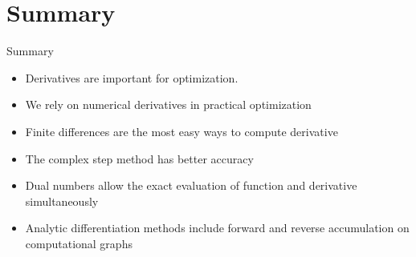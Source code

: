 \documentclass{beamer}
\begin{document}
\section{Summary}
\begin{frame}{Summary}
    \begin{itemize}
        \item Derivatives are important for optimization. 
        \item We rely on numerical derivatives in practical optimization
        \item Finite differences are the most easy ways to compute derivative
        \item The complex step method has better accuracy
        \item Dual numbers allow the exact evaluation of function and derivative simultaneously
        \item Analytic differentiation methods include forward and reverse accumulation on computational graphs
    \end{itemize}
\end{frame}
\end{document}

